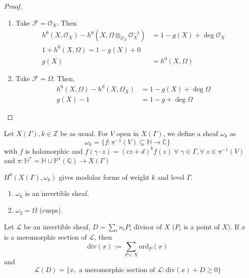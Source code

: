 \documentclass[oneside, 12pt, ]{scrbook}
\newcommand{\CC}{\mathbb C}
\newcommand{\QQ}{\mathbb Q}
\newcommand{\ZZ}{\mathbb Z}
\newcommand{\PP}{\mathbb{P}}
\newcommand{\ord}{\mathrm{ord}}
\theoremstyle{theorem}
\begin{document}
\begin{proof}
\begin{enumerate}
\item Take $\mathcal{F}  = \mathcal{O}_{X}$. Then 
\begin{align*}
h^{0}(X, \mathcal{O}_{X}) - h^{0}(X, \Omega \otimes_{\mathcal{O}_{X}} \mathcal{O}_{X}^{-1}) &= 1 - g(X) + \deg \mathcal{O}_{X} \\
1 + h^{0}(X, \Omega) = 1- g(X) + 0\\
g(X) &= h^{0}(X,\Omega)
\end{align*}
\item Take $\mathcal{F} = \Omega$. Then, 
\begin{align*}
h^{0}(X, \Omega) - h^{0}(X, \Omega_{X}) &= 1 - g(X) + \deg \Omega \\
g(X) - 1 &= 1-g + \deg \Omega
\end{align*}
\end{enumerate}
\end{proof}

\begin{lemma}

\end{lemma}

\begin{definition}
Let $X(\Gamma), k \in \ZZ$ be as usual. For $V$ open in $X(\Gamma)$, we define a sheaf $\omega_{k}$ as $$\omega_{k} = \{f: \pi^{-1}(V) \subseteq \mathbb{H} \rightarrow \CC\}$$ with $f$ is holomorphic and $f(\gamma \cdot z) = (cz+d)^k f(z) \; \forall \; \gamma \in \Gamma, \forall \; z \in \pi^{-1}(V)$ and $\pi: \mathbb{H}^{*} = \mathbb{H} \cup \PP^{1}(\QQ) \rightarrow X(\Gamma)$ 
\end{definition}

\begin{remark}
$H^{0}(X(\Gamma), \omega_{k})$ gives modular forms of weight $k$ and level $\Gamma$. 
\end{remark}

\begin{theorem}
\begin{enumerate}
\item $\omega_{k}$ is an invertible sheaf.
\item $\omega_{2} = \Omega$ (cusps).
\end{enumerate}
\end{theorem}

Let $\mathcal{L}$ be an invertible sheaf, $D =\sum_{i} n_{i}P_{i}$ divisor of $X$ ($P_{i}$ is a point of $X$). If $x$ is a meromorphic section of $\mathcal{L}$, then $$\mathrm{div}(x) := \sum_{P \in X} \ord_{P}(x)$$ and $$\mathcal{L}(D) = \{x, \text{ a meromorphic section of }\mathcal{L}: \mathrm{div}(x) + D \geq 0\}$$
\end{document}
